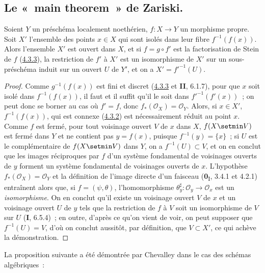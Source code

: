 \subsection{Le «~main theorem~» de Zariski.}
\label{subsection:III.4.4-fr}

\begin{proposition}[4.4.1]
\label{III.4.4.1-fr}
Soient $Y$ un préschéma localement noethérien, $f:X\to Y$ un morphisme
propre. Soit $X'$ l'ensemble des points $x\in X$ qui sont isolés dans leur
fibre $f^{-1}(f(x))$. Alors l'ensemble $X'$ est ouvert dans $X$, et si
$f=g\circ f'$ est la factorisation de Stein de $f$
\textup{(\hyperref[III.4.3.3-fr]{4.3.3})}, la restriction de $f'$ à $X'$ est un
isomorphisme de $X'$ sur un sous-préschéma induit sur un ouvert $U$ de $Y'$,
et on a $X'=f'^{-1}(U)$.
\end{proposition}

\begin{proof}
Comme $g^{-1}(f(x))$ est fini et discret
(\hyperref[III.4.3.3-fr]{4.3.3} et \textbf{II}, 6.1.7), pour que $x$ soit isolé dans
$f^{-1}(f(x))$, il faut et il suffit qu'il le soit dans
$f'^{-1}(f'(x))$~; on peut donc se borner au cas où $f'=f$, donc
$f_*(\mathcal O_X)=\mathcal O_Y$. Alors, si $x\in X'$,
$f^{-1}(f(x))$, qui est connexe (\hyperref[III.4.3.2-fr]{4.3.2}) est
nécessairement réduit au point $x$. Comme $f$ est fermé, pour tout voisinage
ouvert $V$ de $x$ dans $X$, $f(X\setmin V)$ est fermé dans $Y$ et ne contient pas
$y=f(x)$, puisque $f^{-1}(y)=\{x\}$~; si $U$ est le complémentaire de
$f(X\setmin V)$ dans $Y$, on a $f^{-1}(U)\subset V$, et on en conclut que les
images réciproques par $f$ d'un système fondamental de voisinages ouverts de
$y$ forment un système fondamental de voisinages ouverts de $x$. L'hypothèse
$f_*(\mathcal O_X)=\mathcal O_Y$ et la définition de l'image directe d'un
faisceau (\textbf{0}\textsubscript{I}, 3.4.1 et 4.2.1) entraînent alors que, si
$f=(\psi,\theta)$, l'homomorphisme
$\theta_y^\sharp:\mathcal O_y\to\mathcal O_x$ est un \emph{isomorphisme}. On en conclut
qu'il existe un voisinage ouvert $V$ de $x$ et un voisinage ouvert $U$ de
$y$ tels que la restriction de $f$ à $V$ soit un isomorphisme de $V$ sur
$U$ (\textbf{I}, 6.5.4)~; en outre, d'après ce qu'on vient de voir,
on peut supposer que $f^{-1}(U)=V$, d'où on conclut aussitôt, par définition,
que $V\subset X'$, ce qui achève la démonstration.
\end{proof}

La proposition suivante a été démontrée par Chevalley dans le cas des schémas
algébriques~:

